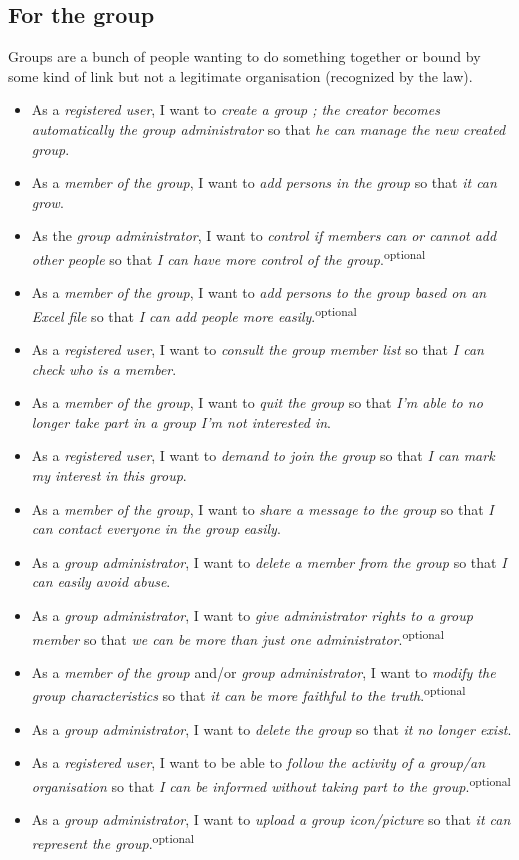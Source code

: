\subsection{For the group}
Groups are a bunch of people wanting to do something together or bound by some kind of link but not a legitimate organisation (recognized by the law).
\begin{itemize}
    \item As a \textit{registered user}, I want to \textit{create a group ; the creator becomes automatically the group administrator} so that \textit{he can manage the new created group}.
    \item As a \textit{member of the group}, I want to \textit{add persons in the group} so that \textit{it can grow}.
    \item As the \textit{group administrator}, I want to \textit{control if members can or cannot add other people} so that \textit{I can have more control of the group}.\textsuperscript{optional}
    \item As a \textit{member of the group}, I want to \textit{add persons to the group based on an Excel file} so that \textit{I can add people more easily}.\textsuperscript{optional}
    \item As a \textit{registered user}, I want to \textit{consult the group member list} so that \textit{I can check who is a member}.
    \item As a \textit{member of the group}, I want to \textit{quit the group} so that \textit{I'm able to no longer take part in a group I'm not interested in}.
    \item As a \textit{registered user}, I want to \textit{demand to join the group} so that \textit{I can mark my interest in this group}.
    \item As a \textit{member of the group}, I want to \textit{share a message to the group} so that \textit{I can contact everyone in the group easily}.
    \item As a \textit{group administrator}, I want to \textit{delete a member from the group} so that \textit{I can easily avoid abuse}.
    \item As a \textit{group administrator}, I want to \textit{give administrator rights to a group member} so that \textit{we can be more than just one administrator}.\textsuperscript{optional}
    \item As a \textit{member of the group} and/or \textit{group administrator}, I want to \textit{modify the group characteristics} so that \textit{it can be more faithful to the truth}.\textsuperscript{optional}
    \item As a \textit{group administrator}, I want to \textit{delete the group} so that \textit{it no longer exist}.
    \item As a \textit{registered user}, I want to be able to \textit{follow the activity of a group/an organisation} so that \textit{I can be informed without taking part to the group}.\textsuperscript{optional}
    \item As a \textit{group administrator}, I want to \textit{upload a group icon/picture} so that \textit{it can represent the group}.\textsuperscript{optional}
\end{itemize}

